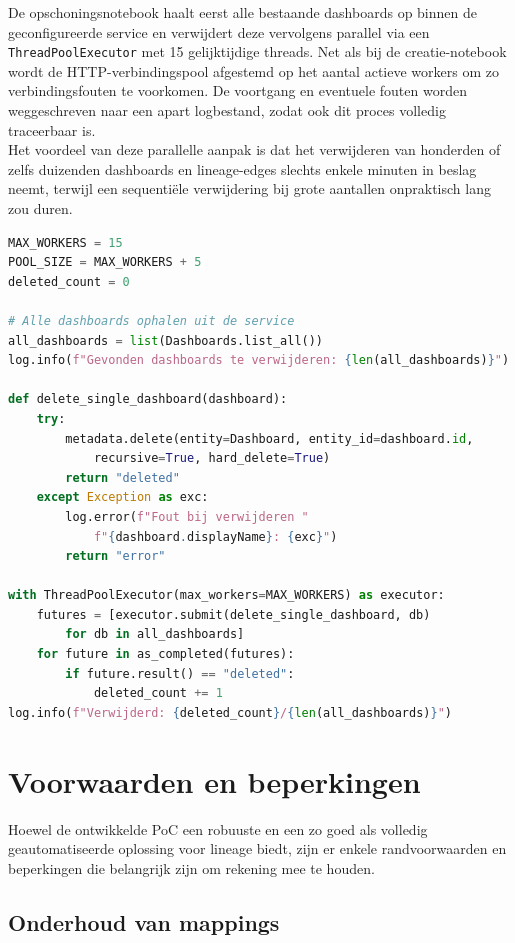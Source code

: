 De opschoningsnotebook haalt eerst alle bestaande dashboards op binnen de geconfigureerde service en verwijdert deze vervolgens parallel via een \texttt{ThreadPoolExecutor} met 15 gelijktijdige threads. Net als bij de creatie-notebook wordt de HTTP-verbindingspool afgestemd op het aantal actieve workers om zo verbindingsfouten te voorkomen. De voortgang en eventuele fouten worden weggeschreven naar een apart logbestand, zodat ook dit proces volledig traceerbaar is.\\

Het voordeel van deze parallelle aanpak is dat het verwijderen van honderden of zelfs duizenden dashboards en lineage-edges slechts enkele minuten in beslag neemt, terwijl een sequentiële verwijdering bij grote aantallen onpraktisch lang zou duren.\\

\begin{lstlisting}[language=python, caption={Parallelle opschoning van dashboards}, label={lst:cleanup}]
MAX_WORKERS = 15
POOL_SIZE = MAX_WORKERS + 5
deleted_count = 0

# Alle dashboards ophalen uit de service
all_dashboards = list(Dashboards.list_all())
log.info(f"Gevonden dashboards te verwijderen: {len(all_dashboards)}")

def delete_single_dashboard(dashboard):
	try:
		metadata.delete(entity=Dashboard, entity_id=dashboard.id,
			recursive=True, hard_delete=True)
		return "deleted"
	except Exception as exc:
		log.error(f"Fout bij verwijderen "
			f"{dashboard.displayName}: {exc}")
		return "error"

with ThreadPoolExecutor(max_workers=MAX_WORKERS) as executor:
	futures = [executor.submit(delete_single_dashboard, db)
		for db in all_dashboards]
	for future in as_completed(futures):
		if future.result() == "deleted":
			deleted_count += 1
log.info(f"Verwijderd: {deleted_count}/{len(all_dashboards)}")
\end{lstlisting}

\section{Voorwaarden en beperkingen}

Hoewel de ontwikkelde PoC een robuuste en een zo goed als volledig geautomatiseerde oplossing voor lineage biedt, zijn er enkele randvoorwaarden en beperkingen die belangrijk zijn om rekening mee te houden.\\

\subsection{Onderhoud van mappings}

